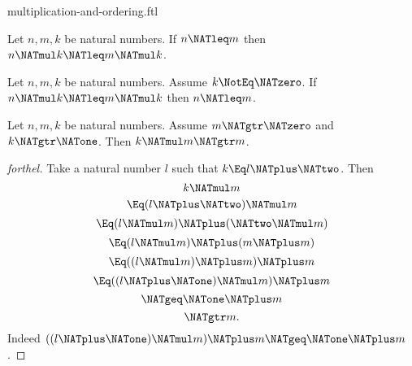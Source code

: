 \documentclass{stex}
\begin{document}
\begin{smodule}{multiplication-and-ordering.ftl}
\begin{corollary}[forthel,id=ARITHMETIC_06_8946886668976128]
  Let $n, m, k$ be natural numbers.
  If $n \NATleq m$ then $n \NATmul k \NATleq m \NATmul k$.
\end{corollary}

\begin{corollary}[forthel,id=ARITHMETIC_06_4374428949413888]
  Let $n, m, k$ be natural numbers.
  Assume $k \NotEq \NATzero$.
  If $n \NATmul k \NATleq m \NATmul k$ then $n \NATleq m$.
\end{corollary}

\begin{proposition}[forthel,id=ARITHMETIC_06_8813409145454592]
  Let $n, m, k$ be natural numbers.
  Assume $m \NATgtr \NATzero$ and $k \NATgtr \NATone$.
  Then $k \NATmul m \NATgtr m$.
\end{proposition}
\begin{proof}[forthel]
  Take a natural number $l$ such that $k \Eq l \NATplus \NATtwo$.
  Then
  \[  k \NATmul m                       \]
  \[    \Eq (l \NATplus \NATtwo) \NATmul m             \]
  \[    \Eq (l \NATmul m) \NATplus (\NATtwo \NATmul m)   \]
  \[    \Eq (l \NATmul m) \NATplus (m \NATplus m)       \]
  \[    \Eq ((l \NATmul m) \NATplus m) \NATplus m       \]
  \[    \Eq ((l \NATplus \NATone) \NATmul m) \NATplus m       \]
  \[    \NATgeq \NATone \NATplus m                    \]
  \[    \NATgtr m.                          \]
  Indeed $((l \NATplus \NATone) \NATmul m) \NATplus m \NATgeq \NATone \NATplus m$.
\end{proof}
\end{smodule}
\end{document}
